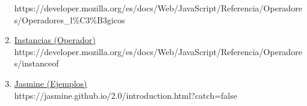 \documentclass{article}
\begin{document}
\begin{enumerate}
    \textsf{https://developer.mozilla.org/es/docs/Web/JavaScript/Referencia/Operadores/Operadores\_l\%C3\%B3gicos}
    \item \href{https://developer.mozilla.org/es/docs/Web/JavaScript/Referencia/Operadores/instanceof}{Instancias (Operador)}\\
    \textsf{https://developer.mozilla.org/es/docs/Web/JavaScript/Referencia/Operadores/instanceof}
    \item \href{https://jasmine.github.io/2.0/introduction.html?catch=false}{Jasmine (Ejemplos)}\\
    \textsf{https://jasmine.github.io/2.0/introduction.html?catch=false}
\end{enumerate}
\end{document}
